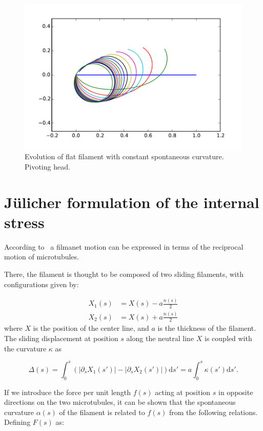 \documentclass[12pt]{article}
\renewcommand{\d}{\mathrm{d}}
\begin{document}
\begin{figure}
  \centering
  \includegraphics[width=\textwidth]{circle_pivoting}
  \caption{Evolution of flat filament with constant spontaneous
    curvature. Pivoting head.}
  \label{fig:circle-pivoting}
\end{figure}

\section{J\"ulicher formulation of the internal stress}

According to~\cite{CamaletJulicher2000} a filmanet motion can be expressed in terms of the reciprocal motion of microtubules.

There, the filament is thought to be composed of two sliding filaments, with configurations given by:

$$
\begin{aligned}
X_1(s) &= X(s)-a\frac{n(s)}{2} \\
X_2(s) &= X(s)+a\frac{n(s)}{2} 
\end{aligned}
$$
%
where $X$ is the position of the center line, and $a$ is the thickness of the filament. 
The sliding displacement at position $s$ along the neutral line $X$ is coupled with the curvature $\kappa$ as

$$
\Delta(s) = \int_0^s\left(|\partial_s X_1(s')|-|\partial_s
  X_2(s')|\right) \d s' = a\int_0^s \kappa(s') \d s'.
$$

If we introduce the force per unit length $f(s)$ acting at position
$s$ in opposite directions on the two microtubules, it can be shown
that the spontaneous curvature $\alpha(s)$ of the filament is related
to $f(s)$ from the following relations. Defining $F(s)$ as:
\end{document}
